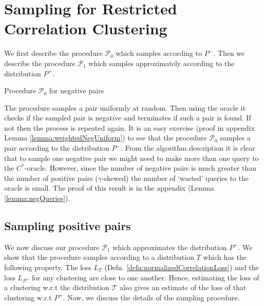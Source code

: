 \documentclass[12pt]{article}
\newcommand{\mc}{\mathcal}
\begin{document}
\section{Sampling for Restricted Correlation Clustering}
\label{section:samplingRCC}
We first describe the procedure $\mc P_0$ which samples according to $P^-$. Then we describe the procedure $\mc P_1$ which samples approximately according to the distribution $P^+$. 

\SetAlgoNoLine
\LinesNumbered
\SetNlSkip{-0.4em}
\begin{algorithm}
\label{alg:weightedNegPairs}
\caption{Procedure $\mc P_0$ for negative pairs}

\Indp{}

\vspace{0.1in} 
\end{algorithm}
The procedure samples a pair uniformly at random. Then using the oracle it checks if the sampled pair is negative and terminates if such a pair is found. If not then the process is repeated again. It is an easy exercise (proof in appendix Lemma \ref{lemma:weightedNegUniform}) to see that the procedure $\mc P_0$ samples a pair according to the distribution $P^-$. From the algorithm description it is clear that to sample one negative pair we might need to make more than one query to the $C^*$-oracle. However, since the number of negative pairs is much greater than the number of positive pairs ($\gamma$-skewed) the number of `wasted' queries to the oracle is small. The proof of this result is in the appendix (Lemma \ref{lemma:negQueries}).
   
\subsection{Sampling positive pairs}
\label{section:samplingPositiveLSHable}

We now discuss our procedure $\mc P_1$ which approximates the distribution $P^+$. We show that the procedure samples according to a distribution $T$ which has the following property. The loss $L_{T}$ (Defn. \ref{defn:normalizedCorrelationLoss}) and the loss $L_{P^+}$ for any clustering are close to one another. Hence, estimating the loss of a clustering w.r.t the distribution $\mc T$ also gives an estimate of the loss of that clustering w.r.t $P^+$. Now, we discuss the details of the sampling procedure. 
\end{document}

